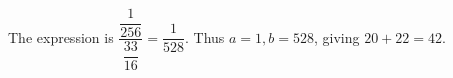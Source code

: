 The expression is $\dfrac{\dfrac{1}{256}}{\dfrac{33}{16}} = \dfrac{1}{528}$. Thus $a=1,b=528$, giving $20+22=\boxed{42}$.
